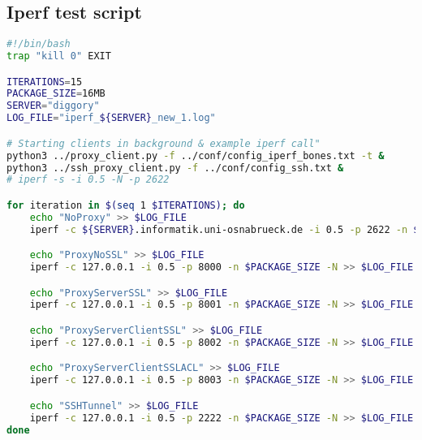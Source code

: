 \subsection{Iperf test script}
\begin{lstlisting}[frame=single, language=bash, caption={Iperf test script},label=code::iperf]
#!/bin/bash
trap "kill 0" EXIT

ITERATIONS=15
PACKAGE_SIZE=16MB
SERVER="diggory"
LOG_FILE="iperf_${SERVER}_new_1.log"

# Starting clients in background & example iperf call"
python3 ../proxy_client.py -f ../conf/config_iperf_bones.txt -t &
python3 ../ssh_proxy_client.py -f ../conf/config_ssh.txt &
# iperf -s -i 0.5 -N -p 2622

for iteration in $(seq 1 $ITERATIONS); do
    echo "NoProxy" >> $LOG_FILE
    iperf -c ${SERVER}.informatik.uni-osnabrueck.de -i 0.5 -p 2622 -n $PACKAGE_SIZE -N >> $LOG_FILE

    echo "ProxyNoSSL" >> $LOG_FILE
    iperf -c 127.0.0.1 -i 0.5 -p 8000 -n $PACKAGE_SIZE -N >> $LOG_FILE

    echo "ProxyServerSSL" >> $LOG_FILE
    iperf -c 127.0.0.1 -i 0.5 -p 8001 -n $PACKAGE_SIZE -N >> $LOG_FILE

    echo "ProxyServerClientSSL" >> $LOG_FILE
    iperf -c 127.0.0.1 -i 0.5 -p 8002 -n $PACKAGE_SIZE -N >> $LOG_FILE

    echo "ProxyServerClientSSLACL" >> $LOG_FILE
    iperf -c 127.0.0.1 -i 0.5 -p 8003 -n $PACKAGE_SIZE -N >> $LOG_FILE

    echo "SSHTunnel" >> $LOG_FILE
    iperf -c 127.0.0.1 -i 0.5 -p 2222 -n $PACKAGE_SIZE -N >> $LOG_FILE
done
\end{lstlisting}